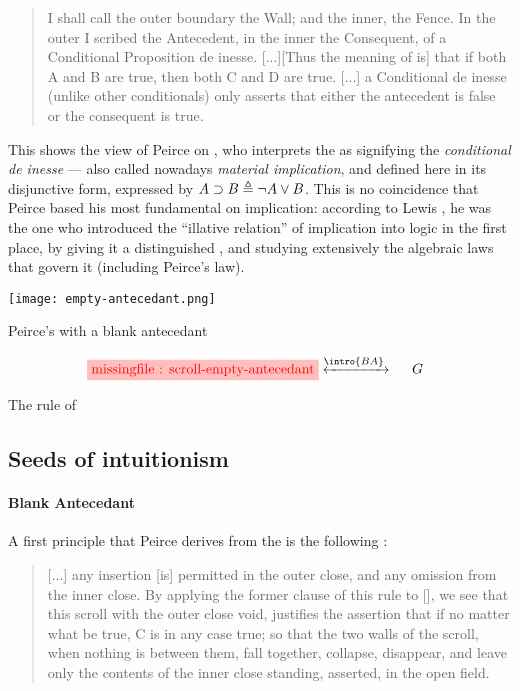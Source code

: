 \begin{scope}
\begin{quote}
  I shall call the outer boundary the Wall; and the inner, the Fence. In the
outer I scribed the Antecedent, in the inner the Consequent, of a Conditional
Proposition de inesse. [...][Thus the meaning of  is] that if
both A and B are true, then both C and D are true. [...] a Conditional de inesse
(unlike other conditionals) only asserts that either the antecedent is false or
the consequent is true. 
\end{quote}

This shows the  view of Peirce on , who interprets the
 as signifying the \textit{conditional de inesse} --- also called
nowadays \emph{material implication}, and defined here in its disjunctive form,
expressed  by $A \supset B \triangleq \neg A \lor B$. This is no
coincidence that Peirce based his most fundamental  on implication:
according to Lewis , he was the one who
introduced the ``illative relation'' of implication into  logic in
the first place, by giving it a distinguished , and studying
extensively the algebraic laws that govern it (including Peirce's law).

\begin{marginfigure}
  \texttt{[image: empty-antecedant.png]}
  \caption{Peirce's  with a blank antecedant}
\end{marginfigure}

\begin{marginfigure}
  $$
  \!\!\!\!\!\!\!\!\stkfig{1}{scroll-empty-antecedant}
  \!\!\!\!\xinvstep{\intro{BA}}~~~~
  G
  $$
  \caption{The rule of }
\end{marginfigure}

\subsection{Seeds of intuitionism}

\paragraph{Blank Antecedant}

A first principle that Peirce derives from the  is the following
\cite[p.~534]{peirce_prolegomena_1906}:

\begin{quote}
  [...] any insertion [is] permitted in the outer close, and any omission from
the inner close. By applying the former clause of this rule to
[], we see that this scroll with the outer close void,
justifies the assertion that if no matter what be true, C is in any case true;
so that the two walls of the scroll, when nothing is between them, fall
together, collapse, disappear, and leave only the contents of the inner close
standing, asserted, in the open field.
\end{quote}


\end{scope}
